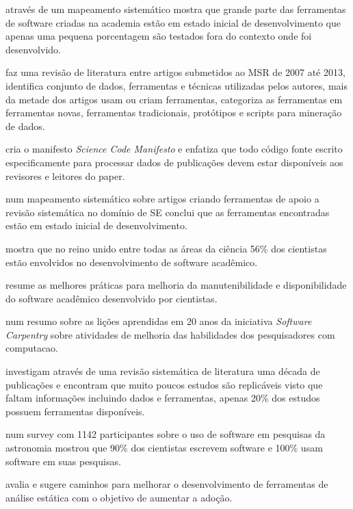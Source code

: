 através de um mapeamento sistemático mostra que grande parte das ferramentas de
software criadas na academia estão em estado inicial de desenvolvimento que
apenas uma pequena porcentagem são testados fora do contexto onde foi
desenvolvido. 

faz uma revisão de literatura entre artigos submetidos ao MSR de 2007 até 2013,
identifica conjunto de dados, ferramentas e técnicas utilizadas pelos autores,
mais da metade dos artigos usam ou criam ferramentas, categoriza as ferramentas
em ferramentas novas, ferramentas tradicionais, protótipos e scripts para
mineração de dados.

cria o manifesto {\it Science Code Manifesto} e enfatiza que todo código fonte
escrito especificamente para processar dados de publicações devem estar
disponíveis aos revisores e leitores do paper.

 num mapeamento sistemático sobre artigos criando
ferramentas de apoio a revisão sistemática no domínio de SE conclui que as
ferramentas encontradas estão em estado inicial de desenvolvimento.

 mostra que no reino unido entre todas as áreas da
ciência 56\% dos cientistas estão envolvidos no desenvolvimento de software
acadêmico.

 resume as melhores práticas para melhoria da
manutenibilidade e disponibilidade do software acadêmico desenvolvido por
cientistas.

 num resumo sobre as lições aprendidas em 20
anos da iniciativa {\it Software Carpentry} sobre atividades de melhoria das
habilidades dos pesquisadores com computacao.

investigam através de uma revisão sistemática de literatura uma década de
publicações e encontram que muito poucos estudos são replicáveis visto que
faltam informações incluindo dados e ferramentas, apenas 20\% dos estudos
possuem ferramentas disponíveis.

num survey com 1142 participantes sobre o uso de software em pesquisas da
astronomia mostrou que 90\% dos cientistas escrevem software e 100\% usam
software em suas pesquisas.

 avalia e sugere caminhos para melhorar o
desenvolvimento de ferramentas de análise estática com o objetivo de aumentar a
adoção.

